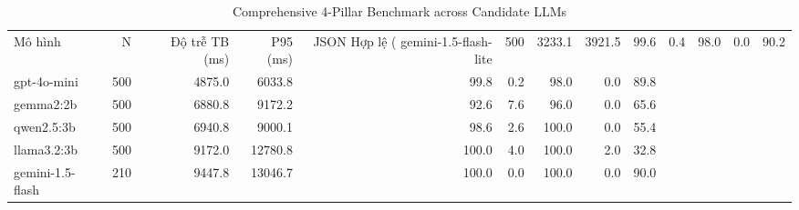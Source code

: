 \begin{table}
\caption{Comprehensive 4-Pillar Benchmark across Candidate LLMs}
\label{tab:4pillars_benchmark}
\begin{tabular}{lrrrrrrrr}
\toprule
Mô hình & N & Độ trễ TB (ms) & P95 (ms) & JSON Hợp lệ (%
\midrule
gemini-1.5-flash-lite & 500 & 3233.1 & 3921.5 & 99.6 & 0.4 & 98.0 & 0.0 & 90.2 \\
gpt-4o-mini & 500 & 4875.0 & 6033.8 & 99.8 & 0.2 & 98.0 & 0.0 & 89.8 \\
gemma2:2b & 500 & 6880.8 & 9172.2 & 92.6 & 7.6 & 96.0 & 0.0 & 65.6 \\
qwen2.5:3b & 500 & 6940.8 & 9000.1 & 98.6 & 2.6 & 100.0 & 0.0 & 55.4 \\
llama3.2:3b & 500 & 9172.0 & 12780.8 & 100.0 & 4.0 & 100.0 & 2.0 & 32.8 \\
gemini-1.5-flash & 210 & 9447.8 & 13046.7 & 100.0 & 0.0 & 100.0 & 0.0 & 90.0 \\
\bottomrule
\end{tabular}
\end{table}
